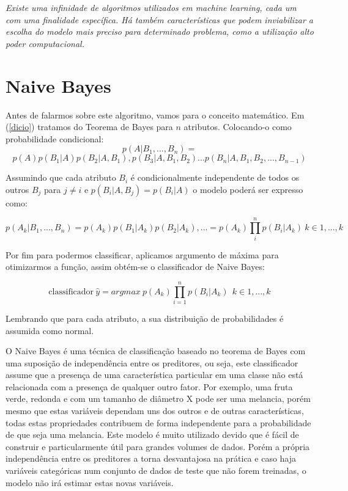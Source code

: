 \documentclass[
]{book}
\begin{document}
\emph{Existe uma infinidade de algoritmos utilizados em machine learning, cada um com uma finalidade específica. Há também características que podem inviabilizar a escolha do modelo mais preciso para determinado problema, como a utilização alto poder computacional.}

\hypertarget{naive-bayes}{%
\section{Naive Bayes}\label{naive-bayes}}

Antes de falarmos sobre este algoritmo, vamos para o conceito matemático. Em (\ref{dicio}) tratamos do Teorema de Bayes para \(n\) atributos. Colocando-o como probabilidade condicional:
\[p(A|B_{1},...,B_{n}) = \]
\begin{equation} 
  p(A)p(B_{1}|A)p(B_{2}|A,B_{1}),p(B_{3}|A,B_{1},B_{2})...p(B_{n}|A,B_{1},B_{2},...,B_{n−1})
  \label{eq:bayescond}
\end{equation}

Assumindo que cada atributo \(B_i\) é condicionalmente independente de todos os outros \(B_j\) para \(j\neq i\) e \(p(B_i|A,B_j)=p(B_i|A)\) o modelo poderá ser expresso como:

\begin{equation} 
  p(A_k|B_1,...,B_n)=p(A_k)p(B_1|A_k)p(B_2|A_k),...=p(A_k)\prod_i^n p(B_i|A_k) \ k ∈{1,...,k}
  \label{eq:bayesprodutorio}
\end{equation}

Por fim para podermos classificar, aplicamos argumento de máxima para otimizarmos a função, assim obtém-se o classificador de Naive Bayes:

\begin{equation} 
  \mbox{classificador} \ \hat{y}=argmax \ p(A_k)\displaystyle \prod_{i=1}^n p(B_i|A_k) \ \ k ∈{1,...,k}
  \label{eq:naivebayes}
\end{equation}

Lembrando que para cada atributo, a sua distribuição de probabilidades é assumida como normal.

O Naive Bayes é uma técnica de classificação baseado no teorema de Bayes com uma suposição de independência entre os preditores, ou seja, este classificador assume que a presença de uma característica particular em uma classe não está relacionada com a presença de qualquer outro fator. Por exemplo, uma fruta verde, redonda e com um tamanho de diâmetro X pode ser uma melancia, porém mesmo que estas variáveis dependam uns dos outros e de outras características, todas estas propriedades contribuem de forma independente para a probabilidade de que seja uma melancia. Este modelo é muito utilizado devido que é fácil de construir e particularmente útil para grandes volumes de dados. Porém a própria independência entre os preditores a torna desvantajosa na prática e caso haja variáveis categóricas num conjunto de dados de teste que não forem treinadas, o modelo não irá estimar estas novas variáveis.
\end{document}
